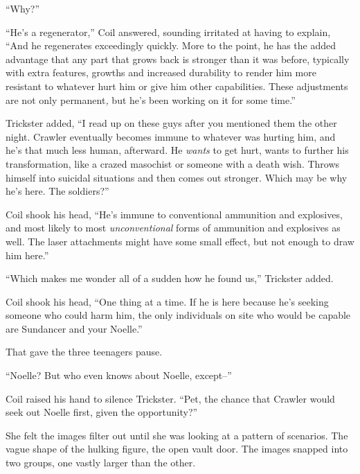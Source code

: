 ``Why?''



``He's a regenerator,'' Coil answered, sounding irritated at having to explain, ``And he regenerates exceedingly quickly.  More to the point, he has the added advantage that any part that grows back is stronger than it was before, typically with extra features, growths and increased durability to render him more resistant to whatever hurt him or give him other capabilities.  These adjustments are not only permanent\emph{, }but he's been working on it for some time.''



Trickster added, ``I read up on these guys after you mentioned them the other night.  Crawler eventually becomes immune to whatever was hurting him, and he's that much less human, afterward.  He \emph{wants} to get hurt, wants to further his transformation, like a crazed masochist or someone with a death wish.  Throws himself into suicidal situations and then comes out stronger.  Which may be why he's here.  The soldiers?''



Coil shook his head, ``He's immune to conventional ammunition and explosives, and most likely to most \emph{unconventional} forms of ammunition and explosives as well.  The laser attachments might have some small effect, but not enough to draw him here.''



``Which makes me wonder all of a sudden how he found us,'' Trickster added.



Coil shook his head, ``One thing at a time.  If he is here because he's seeking someone who could harm him, the only individuals on site who would be capable are Sundancer and your Noelle.''



That gave the three teenagers pause.



``Noelle?  But who even knows about Noelle, except--''



Coil raised his hand to silence Trickster.  ``Pet, the chance that Crawler would seek out Noelle first, given the opportunity?''



She felt the images filter out until she was looking at a pattern of scenarios.  The vague shape of the hulking figure, the open vault door.  The images snapped into two groups, one vastly larger than the other.



